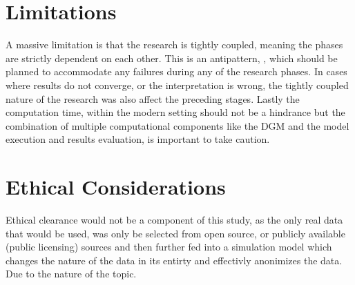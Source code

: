 \section{Limitations} \label{methlim}
A massive limitation is that the research is tightly coupled, meaning the phases are strictly dependent on each other. This is an antipattern, \parencite{joshi_beginning_2016}, which should be planned to accommodate any failures during any of the research phases. In cases where results do not converge, or the interpretation is wrong, the tightly coupled nature of the research was also affect the preceding stages. Lastly the computation time, within the modern setting should not be a hindrance but the combination of multiple computational components like the DGM and the model execution and results evaluation, is important to take caution. 

\section{Ethical Considerations}
Ethical clearance would not be a component of this study, as the only real data that would be used, was only be selected from open source, or publicly available (public licensing) sources and then further fed into a simulation model which changes the nature of the data in its entirty and effectivly anonimizes the data. Due to the nature of the topic. 
